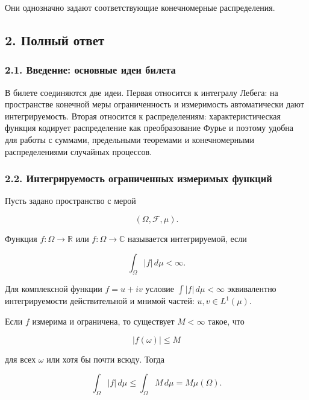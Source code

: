\documentclass[
  11pt,
  a4paper,
]{article}
\begin{document}
Они однозначно задают соответствующие конечномерные распределения.

\subsection{2. Полный
ответ}\label{ux43fux43eux43bux43dux44bux439-ux43eux442ux432ux435ux442}

\subsubsection{2.1. Введение: основные идеи
билета}\label{ux432ux432ux435ux434ux435ux43dux438ux435-ux43eux441ux43dux43eux432ux43dux44bux435-ux438ux434ux435ux438-ux431ux438ux43bux435ux442ux430}

В билете соединяются две идеи. Первая относится к интегралу Лебега: на
пространстве конечной меры ограниченность и измеримость автоматически
дают интегрируемость. Вторая относится к распределениям:
характеристическая функция кодирует распределение как преобразование
Фурье и поэтому удобна для работы с суммами, предельными теоремами и
конечномерными распределениями случайных процессов.

\subsubsection{2.2. Интегрируемость ограниченных измеримых
функций}\label{ux438ux43dux442ux435ux433ux440ux438ux440ux443ux435ux43cux43eux441ux442ux44c-ux43eux433ux440ux430ux43dux438ux447ux435ux43dux43dux44bux445-ux438ux437ux43cux435ux440ux438ux43cux44bux445-ux444ux443ux43dux43aux446ux438ux439}

Пусть задано пространство с мерой

\[
(\Omega,\mathcal F,\mu).
\]

Функция \(f:\Omega\to\mathbb R\) или \(f:\Omega\to\mathbb C\) называется
интегрируемой, если

\[
\int_\Omega |f|\,d\mu<\infty.
\]

Для комплексной функции \(f=u+iv\) условие \(\int |f|\,d\mu<\infty\)
эквивалентно интегрируемости действительной и мнимой частей:
\(u,v\in L^1(\mu)\).

Если \(f\) измерима и ограничена, то существует \(M<\infty\) такое, что

\[
|f(\omega)|\le M
\]

для всех \(\omega\) или хотя бы почти всюду. Тогда

\[
\int_\Omega |f|\,d\mu
\le
\int_\Omega M\,d\mu
=M\mu(\Omega).
\]
\end{document}
